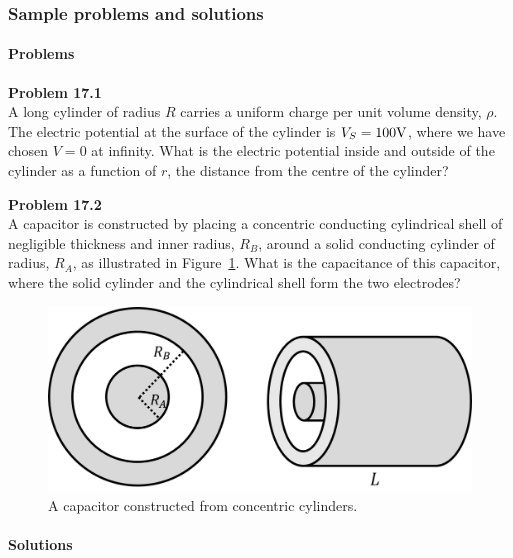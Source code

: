 \subsubsection{Sample problems and solutions}

\paragraph{Problems}

\begin{framed}
\textbf{Problem 17.1}\\
A long cylinder of radius $R$ carries a uniform charge per unit volume density, $\rho$. The electric potential at the surface of the cylinder is $V_S = 100 {\rm V}$, where we have chosen $V=0$ at infinity. What is the electric potential inside and outside of the cylinder as a function of $r$, the distance from the centre of the cylinder?
\end{framed}

\begin{framed}
\textbf{Problem 17.2}\\
A capacitor is constructed by placing a concentric conducting cylindrical shell of negligible thickness and inner radius, $R_B$, around a solid conducting cylinder of radius, $R_A$, as illustrated in Figure~\ref{fig:potential:nestedcylinders}. What is the capacitance of this capacitor, where the solid cylinder and the cylindrical shell form the two electrodes?

\begin{figure}[!htbp]
\centering
\includegraphics[width=0.7\linewidth]{files/nestedcylinders-72db3afa04c1cef3c4b24e2223231d7f.png}
\caption[]{A capacitor constructed from concentric cylinders.}
\label{fig:potential:nestedcylinders}
\end{figure}
\end{framed}

\paragraph{Solutions}

